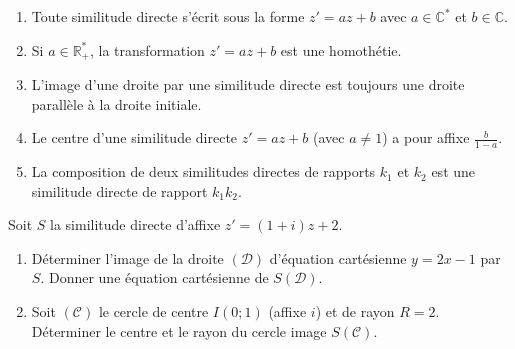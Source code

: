 \documentclass[11pt]{article}
\begin{document}
\begin{exercice}
\begin{enumerate}
    \item Toute similitude directe s'écrit sous la forme $z' = a z + b$ avec $a \in \mathbb{C}^*$ et $b \in \mathbb{C}$.
    \item Si $a \in \mathbb{R}_+^*$, la transformation $z' = a z + b$ est une homothétie.
    \item L'image d'une droite par une similitude directe est toujours une droite parallèle à la droite initiale.
    \item Le centre d'une similitude directe $z' = a z + b$ (avec $a \neq 1$) a pour affixe $\frac{b}{1-a}$.
    \item La composition de deux similitudes directes de rapports $k_1$ et $k_2$ est une similitude directe de rapport $k_1 k_2$.
\end{enumerate}
\end{exercice}

\begin{exercice}
Soit $S$ la similitude directe d'affixe $z' = (1+i)z + 2$.
\begin{enumerate}
    \item Déterminer l'image de la droite $(\mathcal{D})$ d'équation cartésienne $y = 2x - 1$ par $S$. Donner une équation cartésienne de $S(\mathcal{D})$.
    \item Soit $(\mathcal{C})$ le cercle de centre $I(0;1)$ (affixe $i$) et de rayon $R=2$. Déterminer le centre et le rayon du cercle image $S(\mathcal{C})$.
\end{enumerate}
\end{exercice}
\end{document}
